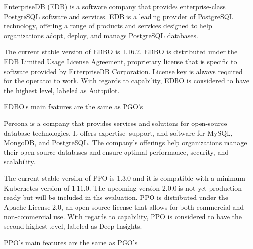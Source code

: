 EnterpriseDB (EDB) is a software company that provides enterprise-class PostgreSQL software and services. EDB is a leading provider of PostgreSQL technology, offering a range of products and services designed to help organizations adopt, deploy, and manage PostgreSQL databases. \cite{EDB}

The current stable version of EDBO is 1.16.2. EDBO is distributed under the EDB Limited Usage License Agreement, proprietary license that is specific to software provided by EnterpriseDB Corporation. License key is always required for the operator to work. With regards to capability, EDBO is considered to have the highest level, labeled as Autopilot. \cite{EDBdocu}

EDBO’s main features are the same as PGO’s \cite{EDBdocu}

Percona is a company that provides services and solutions for open-source database technologies. It offers expertise, support, and software for MySQL, MongoDB, and PostgreSQL. The company's offerings help organizations manage their open-source databases and ensure optimal performance, security, and scalability. \cite{Percona}

The current stable version of PPO is 1.3.0 and it is compatible with a minimum Kubernetes version of 1.11.0. The upcoming version 2.0.0 is not yet production ready but will be included in the evaluation. PPO is distributed under the Apache License 2.0, an open-source license that allows for both commercial and non-commercial use. With regards to capability, PPO is considered to have the second highest level, labeled as Deep Insights. \cite{OperatorHubPercona}

PPO’s main features are the same as PGO’s \cite{OperatorHubPercona}



